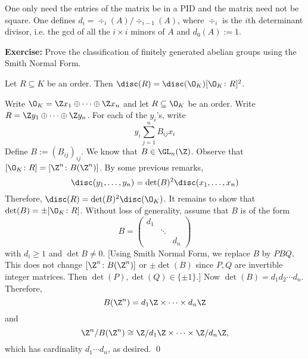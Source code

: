 \begin{rem}
One only need the entries of the matrix be in a PID and the matrix need not be square. One defines $d_i=\div_i(A)/\div_{i-1}(A)$, where $\div_i$ is the $i$th determinant divisor, i.e. the gcd of all the $i \times i$ minors of $A$ and $d_0(A):=1$. 
\end{rem}


\noindent \textbf{Exercise: }Prove the classification of finitely generated abelian groups using the Smith Normal Form. \\


\begin{lem}
Let $R \subseteq K$ be an order. Then $\disc(R)= \disc(\O_K) [\O_K \colon R]^2$. 
\end{lem}

\pf Write $\O_K= \Z x_1 \oplus \cdots \oplus \Z x_n$ and let $R \subseteq \O_K$ be an order. Write $R= \Z y_1 \oplus \cdots \oplus \Z y_n$. For each of the $y_i$'s, write
	\[
	y_i \sum_{j=1}^n B_{ij} x_i
	\]
Define $B:=(B_{ij})_{ij}$. We know that $B \in \GL_n(\Z)$. Observe that $[\O_K \colon R] = [\Z^n \colon B(\Z^n)]$. By some previous remarks,
	\[
	\disc(y_1,\ldots,y_n)= \det(B)^2 \disc(x_1,\ldots,x_n)
	\]
Therefore, $\disc(R)= \det(B)^2 \disc(\O_K)$. It remains to show that $\det(B)= \pm [\O_K \colon R]$. Without loss of generality, assume that $B$ is of the form
	\[
	B=\begin{pmatrix} d_1 & & \\ & \ddots & \\ & & d_n \end{pmatrix}
	\]
with $d_i \geq 1$ and $\det B \neq 0$. [Using Smith Normal Form, we replace $B$ by $PBQ$. This does not change $[\Z^n \colon B(\Z^n)]$ or $\pm\det(B)$ since $P,Q$ are invertible integer matrices. Then $\det(P),\det(Q) \in \{\pm 1\}$.] Now $\det(B)=d_1d_2\cdots d_n$. Therefore,
	\[
	B(\Z^n)= d_1 \Z \times \cdots \times d_n \Z
	\]
and
	\[
	\Z^n/B(\Z^n) \cong \Z/d_1\Z \times \cdots \times \Z/d_n\Z,
	\]
which has cardinality $d_1\cdots d_n$, as desired. \qed \\

